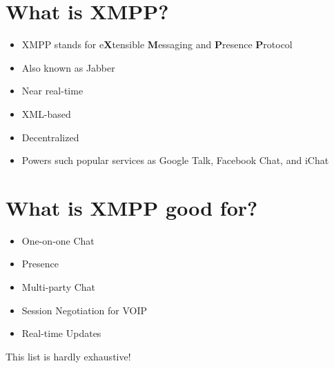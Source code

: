 \section*{What is XMPP?}
\pause

\begin{itemize}
\item XMPP stands for e\textbf{X}tensible \textbf{M}essaging and \textbf{P}resence \textbf{P}rotocol
\pause
\item Also known as Jabber
\pause
\item Near real-time
\pause
\item XML-based
\pause
\item Decentralized
\pause
\item Powers such popular services as Google Talk, Facebook Chat, and iChat
\end{itemize}

\newpage
\section*{What is XMPP good for?}
\pause

\begin{itemize}
\item One-on-one Chat
\pause
\item Presence
\pause
\item Multi-party Chat
\pause
\item Session Negotiation for VOIP
\pause
\item Real-time Updates
\end{itemize}

\pause
\vfill
This list is hardly exhaustive!
